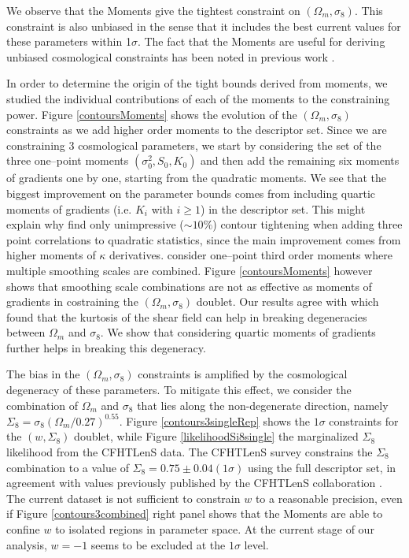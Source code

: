 \documentclass[reprint,aps,prd,superscriptaddress,showkeys,showpacs]{revtex4-1}
\begin{document}

We observe that the Moments give the tightest constraint on $(\Omega_m,\sigma_8)$.  This constraint is also unbiased in the sense that it includes the best current values for these parameters within 1$\sigma$. The fact that the Moments are useful for deriving unbiased cosmological constraints has been noted in previous work  \citep{PetriSpurious}. 

In order to determine the origin of the tight bounds derived from moments, we studied the individual contributions of each of the moments to the constraining power. Figure \ref{contoursMoments} shows the evolution of the $(\Omega_m,\sigma_8)$ constraints as we add higher order moments to the descriptor set. Since we are constraining  3 cosmological parameters, we start by considering the set of the three one--point moments $(\sigma_0^2,S_0,K_0)$ and then add the remaining six moments of gradients one by one, starting from the quadratic moments. We see that the biggest improvement on the parameter bounds comes from including quartic moments of gradients (i.e. $K_i$ with $i\ge1$) in the descriptor set. This might explain why \citep{CFHTFu} find only unimpressive ($\sim10\%$) contour tightening when adding three point correlations to quadratic statistics, since the main improvement comes from higher moments of $\kappa$ derivatives. \citep{CFHTFu} consider one--point third order moments where multiple smoothing scales are combined. Figure \ref{contoursMoments} however shows that smoothing scale combinations are not as effective as moments of gradients in costraining the $(\Omega_m,\sigma_8)$ doublet. Our results agree with  \citep{moments4}  which found that the kurtosis of the shear field can help in breaking degeneracies between $\Omega_m$ and $\sigma_8$. We show that considering quartic moments of gradients further helps in breaking this degeneracy.      

The bias in the $(\Omega_m,\sigma_8)$ constraints is amplified by the cosmological degeneracy of these parameters. To mitigate this effect, we consider the combination of $\Omega_m$ and $\sigma_8$ that lies along the non-degenerate direction, namely $\Sigma_8=\sigma_8(\Omega_m/0.27)^{0.55}$. Figure \ref{contours3singleRep} shows the $1\sigma$ constraints for the $(w,\Sigma_8)$ doublet, while Figure \ref{likelihoodSi8single} the marginalized $\Sigma_8$ likelihood from the CFHTLenS data. The CFHTLenS survey constrains the $\Sigma_8$ combination to a value of $\Sigma_8=0.75\pm0.04(1\sigma)$ using the full descriptor set, in agreement with values previously published by the CFHTLenS collaboration \citep{CFHTKilbinger}. The current dataset is not sufficient to constrain $w$ to a reasonable precision, even if Figure \ref{contours3combined} right panel shows that the Moments are able to confine $w$ to isolated regions in parameter space. At the current stage of our analysis, $w=-1$ seems to be excluded at the $1\sigma$ level.  
\end{document}
